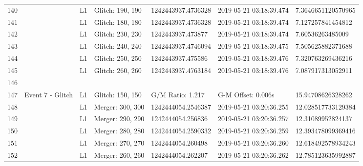 \begin{longtable}{lllllll}
140  &                                                    &       L1 &  Glitch: 190, 190 &  1242443937.4736328 &  2019-05-21 03:18:39.474 &  7.3646651120570965 \\
141  &                                                    &       L1 &  Glitch: 180, 180 &  1242443937.4736328 &  2019-05-21 03:18:39.474 &   7.127257841454812 \\
142  &                                                    &       L1 &  Glitch: 230, 230 &   1242443937.473877 &  2019-05-21 03:18:39.474 &    7.60536263485009 \\
143  &                                                    &       L1 &  Glitch: 240, 240 &  1242443937.4746094 &  2019-05-21 03:18:39.475 &   7.505625882371688 \\
144  &                                                    &       L1 &  Glitch: 250, 250 &   1242443937.475586 &  2019-05-21 03:18:39.476 &   7.320763269436216 \\
145  &                                                    &       L1 &  Glitch: 260, 260 &  1242443937.4763184 &  2019-05-21 03:18:39.476 &   7.087917313052911 \\
146  &                                                    &          &                   &                     &                          &                     \\
147  &                                   Event 7 - Glitch &       L1 &  Glitch: 150, 150 &    G/M Ratio: 1.217 &       G-M Offset: 0.006s &   15.94708626328262 \\
148  &                                                    &       L1 &  Merger: 300, 300 &  1242444054.2546387 &  2019-05-21 03:20:36.255 &  12.028517733129384 \\
149  &                                                    &       L1 &  Merger: 290, 290 &   1242444054.256836 &  2019-05-21 03:20:36.257 &   12.31089952824137 \\
150  &                                                    &       L1 &  Merger: 280, 280 &  1242444054.2590332 &  2019-05-21 03:20:36.259 &  12.393478099369416 \\
151  &                                                    &       L1 &  Merger: 270, 270 &   1242444054.260498 &  2019-05-21 03:20:36.260 &  12.618492578934243 \\
152  &                                                    &       L1 &  Merger: 260, 260 &   1242444054.262207 &  2019-05-21 03:20:36.262 &  12.785123635992887 \\

\end{longtable}
